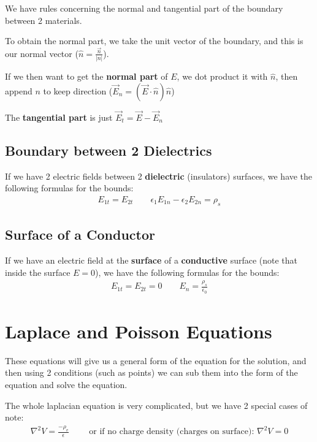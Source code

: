 \documentclass[12pt,letterpaper]{article} \usepackage{amsmath} \usepackage{graphicx} \usepackage[margin=1in]{geometry} \usepackage{longtable}  \usepackage{amssymb}
\begin{document}
	We have rules concerning the normal and tangential part of the boundary between 2 materials. 
	
	To obtain the normal part, we take the unit vector of the boundary, and this is our normal vector ($\hat n = \frac{\vec n}{|n|}$).
	
	If we then want to get the \textbf{normal part} of $E$, we dot product it with $\hat n$, then append $n$ to keep direction ($\vec E_n = (\vec E\cdot \hat n)\hat n$)
	
	The \textbf{tangential part }is just $\vec E_t = \vec E - \vec E_n$

	\subsection{Boundary between 2 Dielectrics}
	If we have 2 electric fields between 2 \textbf{dielectric} (insulators) surfaces, we have the following formulas for the bounds:
	\begin{align*}
		E_{1t} = E_{2t} \qquad \epsilon_1E_{1n}-\epsilon_2 E_{2n} = \rho_s
	\end{align*}

	\subsection{Surface of a Conductor}
	If we have an electric field at the \textbf{surface }of a \textbf{conductive} surface (note that inside the surface $E=0$), we have the following formulas for the bounds:
	\begin{align*}
		E_{1t} = E_{2t} = 0 \qquad E_{n} = \frac{\rho_s}{\epsilon_0}
	\end{align*}

	\section{Laplace and Poisson Equations}
	These equations will give us a general form of the equation for the solution, and then using 2 conditions (such as points) we can sub them into the form of the equation and solve the equation. 
	
	The whole laplacian equation is very complicated, but we have 2 special cases of note:
	\begin{align*}
		\nabla^2 V = \frac{-\rho_v}{\epsilon} \qquad \text{ or if no charge density (charges on surface): } \nabla^2V=0
	\end{align*}
\end{document}
